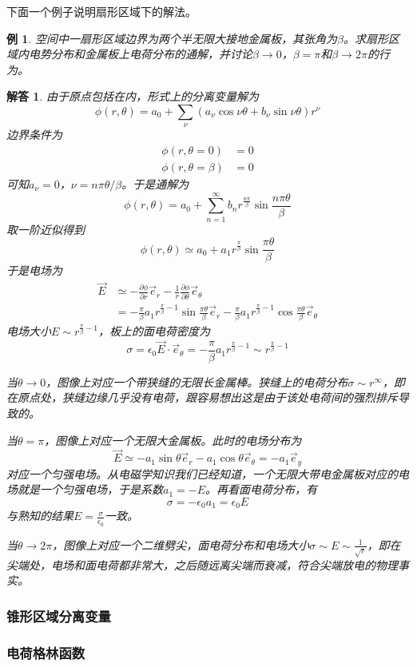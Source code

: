 \documentclass[a4paper,11pt]{ctexart}
\newtheorem{eg}{例}[section]
\newtheorem{ans}{解答}[section]
\newcommand{\beq}{\begin{equation}}
\newcommand{\eeq}{\end{equation}}
\newcommand{\bea}{\begin{equation}\begin{aligned}}
\newcommand{\eea}{\end{aligned}\end{equation}}
\newcommand{\epv}{\epsilon_0}
\newcommand{\pfrac}[2]{\frac{\partial #1}{\partial #2}}
\begin{document}
\par
下面一个例子说明扇形区域下的解法。
\begin{eg}
空间中一扇形区域边界为两个半无限大接地金属板，其张角为$\beta$。求扇形区域内电势分布和金属板上电荷分布的通解，并讨论$\beta \to 0$，$\beta = \pi$和$\beta \to 2\pi$的行为。
\end{eg}
\begin{ans}
由于原点包括在内，形式上的分离变量解为
\beq
\phi(r,\theta) = a_0 + \sum_\nu (a_\nu \cos \nu \theta + b_\nu \sin \nu \theta) r^\nu
\eeq
边界条件为
\bea
\phi(r,\theta=0) &= 0 \\
\phi(r,\theta=\beta) &= 0
\eea
可知$a_\nu = 0$，$\nu = n\pi \theta /\beta$。于是通解为
\beq
\phi(r,\theta) = a_0 + \sum_{n=1}^\infty b_n r^{\frac{n\pi }{\beta}} \sin \frac{n\pi \theta}{\beta}
\eeq
取一阶近似得到
\beq
\phi(r,\theta) \simeq a_0 + a_1 r^\frac{\pi }{\beta} \sin \frac{\pi \theta}{\beta}
\eeq
于是电场为
\bea
\vec{E} &\simeq -\pfrac{\phi}{r} \vec{e}_r - \frac{1}{r} \pfrac{\phi}{\theta} \vec{e}_\theta \\
&=-\frac{\pi }{\beta}a_1 r^{\frac{\pi }{\beta}-1} \sin \frac{\pi  \theta}{\beta} \vec{e}_r-\frac{\pi }{\beta} a_1 r^{\frac{\pi }{\beta}-1} \cos \frac{\pi \theta }{\beta} \vec{e}_\theta
\eea
电场大小$E \sim r^{\frac{\pi }{\beta}-1}$，板上的面电荷密度为
\beq
\sigma = \epv \vec{E} \cdot \vec{e}_\theta  = -\frac{\pi }{\beta} a_1 r^{\frac{\pi }{\beta}-1}\sim r^{\frac{\pi}{\beta} - 1}
\eeq
\par
当$\theta \to 0$，图像上对应一个带狭缝的无限长金属棒。狭缝上的电荷分布$\sigma \sim r^\infty$，即在原点处，狭缝边缘几乎没有电荷，跟容易想出这是由于该处电荷间的强烈排斥导致的。
\par
当$\theta = \pi$，图像上对应一个无限大金属板。此时的电场分布为
\beq
\vec{E} \simeq - a_1 \sin \theta \vec{e}_r - a_1 \cos \theta \vec{e}_\theta = -a_1 \vec{e}_y
\eeq
对应一个匀强电场。从电磁学知识我们已经知道，一个无限大带电金属板对应的电场就是一个匀强电场，于是系数$a_1=-E$。再看面电荷分布，有
\beq
\sigma = - \epv a_1 =\epv E
\eeq
与熟知的结果$E = \frac{\sigma}{\epv}$一致。
\par
当$\theta \to 2\pi$，图像上对应一个二维劈尖，面电荷分布和电场大小$\sigma \sim E\sim \frac{1}{\sqrt{r}}$，即在尖端处，电场和面电荷都非常大，之后随远离尖端而衰减，符合尖端放电的物理事实。
\end{ans}
\subsubsection{锥形区域分离变量}
\subsubsection{电荷格林函数}
\end{document}
